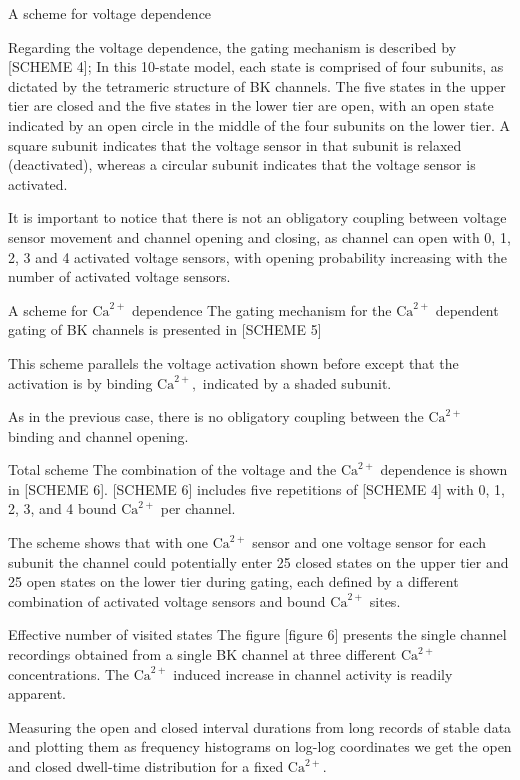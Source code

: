 \documentclass{beamer}
\newcommand{\ca}{\text{Ca}^{2+}}
\begin{document}
\begin{frame}{A scheme for voltage dependence}

Regarding the voltage dependence, the gating mechanism is described by [SCHEME 4]; In this 10-state model, each state is comprised of four subunits, as dictated by the tetrameric structure of BK channels.
The five states in the upper tier are closed and the five states in the lower tier are open, with an open state indicated by an open circle in the middle of the four subunits on the lower tier.
A square subunit indicates that the voltage sensor in that subunit is relaxed (deactivated), whereas a circular subunit indicates that the voltage sensor is activated.

It is important to notice that there is not an obligatory coupling between voltage sensor movement and channel opening and closing, as channel can open with 0, 1, 2, 3 and 4 activated voltage sensors, with opening probability increasing with the number of activated voltage sensors.
\end{frame}

\begin{frame}{A scheme for $\ca$ dependence} 
The gating mechanism for the $\ca$ dependent gating of BK channels is presented in [SCHEME 5]

This scheme parallels the voltage activation shown before except that the activation is by binding $\ca,$ indicated by a shaded subunit.

As in the previous case, there is no obligatory coupling between the $\ca$ binding and channel opening. 

\end{frame}

\begin{frame}{Total scheme}
The combination of the voltage and the $\ca$ dependence is shown in [SCHEME 6].
[SCHEME 6] includes five repetitions of [SCHEME 4] with 0, 1, 2, 3, and 4 bound $\ca$ per channel.

The scheme shows that with one $\ca$ sensor and one voltage sensor for each subunit the channel could potentially enter 25 closed states on the upper tier and 25 open states on the lower tier during gating, each defined by a different combination of activated voltage sensors and bound $\ca$ sites.
\end{frame}

\begin{frame}{Effective number of visited states}
The figure [figure 6] presents the single channel recordings obtained from a single BK channel at three different $\ca$ concentrations.
The $\ca$ induced increase in channel activity is readily apparent.

Measuring the open and closed interval durations from long records of stable data and plotting them as frequency histograms on log-log coordinates we get the open and closed dwell-time distribution for a fixed $\ca.$

\end{frame}
\end{document}
